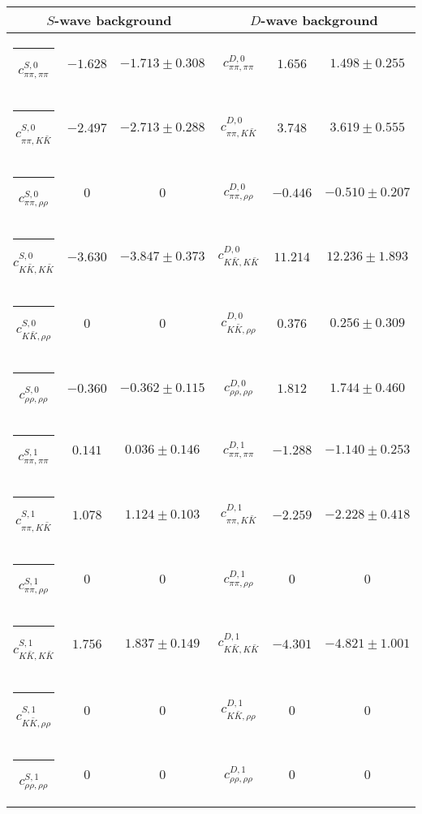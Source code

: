 \begin{table}[h]
\begin{ruledtabular}
\begin{tabular}{c c c c c c c c c}
\end{tabular}
\vspace{2em}
\begin{tabular}{c c c c c c}
\multicolumn{3}{c}{$S$-wave background}  & \multicolumn{3}{c}{$D$-wave background} \\ \hline
\rule[-0.2cm]{-0.1cm}{.55cm} $c^{S,0}_{\pi\pi,\pi\pi}$ &$-1.628$ & $-1.713 \pm 0.308$ & $c^{D,0}_{\pi\pi,\pi\pi}$ &$1.656$ & $1.498 \pm 0.255$ \\
\rule[-0.2cm]{-0.1cm}{.55cm} $c^{S,0}_{\pi\pi,K\bar K}$ &$-2.497$ & $-2.713 \pm 0.288$ & $c^{D,0}_{\pi\pi,K\bar K}$ &$3.748$ & $3.619 \pm 0.555$ \\
\rule[-0.2cm]{-0.1cm}{.55cm} $c^{S,0}_{\pi\pi,\rho\rho}$ &$0$ & $0$ & $c^{D,0}_{\pi\pi,\rho\rho}$ &$-0.446$ & $-0.510 \pm 0.207$ \\
\rule[-0.2cm]{-0.1cm}{.55cm} $c^{S,0}_{K\bar K,K\bar K}$ &$-3.630$ & $-3.847 \pm 0.373$ & $c^{D,0}_{K\bar K,K\bar K}$ &$11.214$ & $12.236 \pm 1.893$ \\
\rule[-0.2cm]{-0.1cm}{.55cm} $c^{S,0}_{K\bar K,\rho\rho}$ &$0$ & $0$ & $c^{D,0}_{K\bar K,\rho\rho}$ &$0.376$ & $0.256 \pm 0.309$ \\
\rule[-0.2cm]{-0.1cm}{.55cm} $c^{S,0}_{\rho\rho,\rho\rho}$ &$-0.360$ & $-0.362 \pm 0.115$ & $c^{D,0}_{\rho\rho,\rho\rho}$ &$1.812$ & $1.744 \pm 0.460$ \\
\rule[-0.2cm]{-0.1cm}{.55cm} $c^{S,1}_{\pi\pi,\pi\pi}$ &$0.141$ & $0.036 \pm 0.146$ & $c^{D,1}_{\pi\pi,\pi\pi}$ &$-1.288$ & $-1.140 \pm 0.253$ \\
\rule[-0.2cm]{-0.1cm}{.55cm} $c^{S,1}_{\pi\pi,K\bar K}$ &$1.078$ & $1.124 \pm 0.103$ & $c^{D,1}_{\pi\pi,K\bar K}$ &$-2.259$ & $-2.228 \pm 0.418$ \\
\rule[-0.2cm]{-0.1cm}{.55cm} $c^{S,1}_{\pi\pi,\rho\rho}$ &$0$ & $0$ & $c^{D,1}_{\pi\pi,\rho\rho}$ &$0$ & $0$ \\
\rule[-0.2cm]{-0.1cm}{.55cm} $c^{S,1}_{K\bar K,K\bar K}$ &$1.756$ & $1.837 \pm 0.149$ & $c^{D,1}_{K\bar K,K\bar K}$ &$-4.301$ & $-4.821 \pm 1.001$ \\
\rule[-0.2cm]{-0.1cm}{.55cm} $c^{S,1}_{K\bar K,\rho\rho}$ &$0$ & $0$ & $c^{D,1}_{K\bar K,\rho\rho}$ &$0$ & $0$ \\
\rule[-0.2cm]{-0.1cm}{.55cm} $c^{S,1}_{\rho\rho,\rho\rho}$ &$0$ & $0$ & $c^{D,1}_{\rho\rho,\rho\rho}$ &$0$ & $0$ \\
\end{tabular}
\end{ruledtabular}
\end{table}
